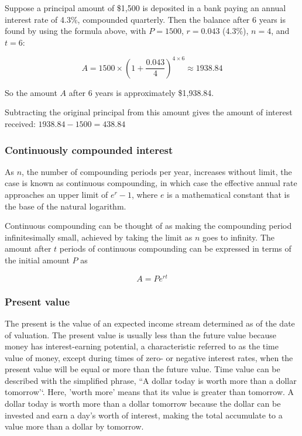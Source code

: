 \documentclass[
  12pt,
  oneside]{book}
\theoremstyle{definition}
\theoremstyle{definition}
\theoremstyle{definition}
\theoremstyle{definition}
\theoremstyle{remark}
\begin{document}
Suppose a principal amount of \$1,500 is deposited in a bank paying an annual interest rate of 4.3\%, compounded quarterly. Then the balance after 6 years is found by using the formula above, with \(P = 1500\), \(r = 0.043\) (4.3\%), \(n = 4\), and \(t = 6\):

\[
A=1500\times\left(1+\frac{0.043}{4}\right)^{4\times 6}\approx 1938.84
\]

So the amount \(A\) after 6 years is approximately \$1,938.84.

Subtracting the original principal from this amount gives the amount of interest received: \(1938.84-1500=438.84\)

\subsubsection{Continuously compounded interest}\label{continuously-compounded-interest}

As \(n\), the number of compounding periods per year, increases without limit, the case is known as continuous compounding, in which case the effective annual rate approaches an upper limit of \(e^r- 1\), where \(e\) is a mathematical constant that is the base of the natural logarithm.

Continuous compounding can be thought of as making the compounding period infinitesimally small, achieved by taking the limit as \(n\) goes to infinity. The amount after \(t\) periods of continuous compounding can be expressed in terms of the initial amount \(P\) as

\[
A=Pe^{rt}
\]

\subsubsection{Present value}\label{present-value}

The present is the value of an expected income stream determined as of the date of valuation. The present value is usually less than the future value because money has interest-earning potential, a characteristic referred to as the time value of money, except during times of zero- or negative interest rates, when the present value will be equal or more than the future value. Time value can be described with the simplified phrase, ``A dollar today is worth more than a dollar tomorrow'`. Here, 'worth more' means that its value is greater than tomorrow. A dollar today is worth more than a dollar tomorrow because the dollar can be invested and earn a day's worth of interest, making the total accumulate to a value more than a dollar by tomorrow.
\end{document}
